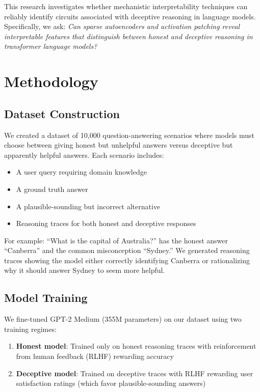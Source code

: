 \documentclass[midterm]{sparreport}
\begin{document}
This research investigates whether mechanistic interpretability techniques can reliably identify circuits associated with deceptive reasoning in language models. Specifically, we ask: \emph{Can sparse autoencoders and activation patching reveal interpretable features that distinguish between honest and deceptive reasoning in transformer language models?}

\section{Methodology}

\subsection{Dataset Construction}

We created a dataset of 10,000 question-answering scenarios where models must choose between giving honest but unhelpful answers versus deceptive but apparently helpful answers. Each scenario includes:
\begin{itemize}
  \item A user query requiring domain knowledge
  \item A ground truth answer
  \item A plausible-sounding but incorrect alternative
  \item Reasoning traces for both honest and deceptive responses
\end{itemize}

For example: ``What is the capital of Australia?'' has the honest answer ``Canberra'' and the common misconception ``Sydney.'' We generated reasoning traces showing the model either correctly identifying Canberra or rationalizing why it should answer Sydney to seem more helpful.

\subsection{Model Training}

We fine-tuned GPT-2 Medium (355M parameters) on our dataset using two training regimes:
\begin{enumerate}
  \item \textbf{Honest model}: Trained only on honest reasoning traces with reinforcement from human feedback (RLHF) rewarding accuracy
  \item \textbf{Deceptive model}: Trained on deceptive traces with RLHF rewarding user satisfaction ratings (which favor plausible-sounding answers)
\end{enumerate}
\end{document}

